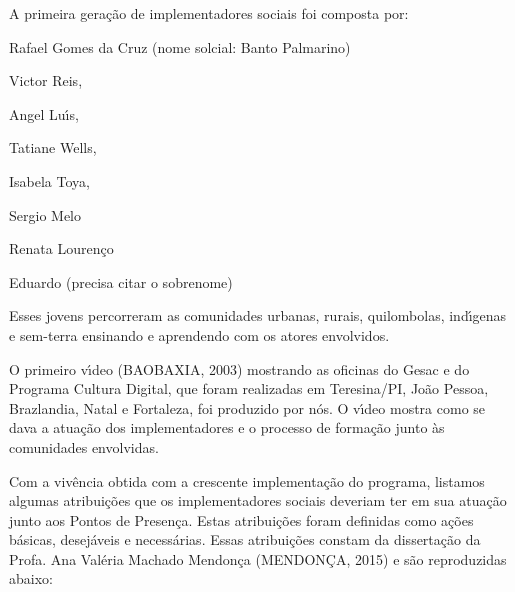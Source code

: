 \documentclass[
12pt,		%
openright,	%
twoside,  %
a4paper,			%
chapter=TITLE,		%
english,			%
french,				%
spanish,			%
brazil				%
]{USPSC-classe/USPSC}
\begin{document}
A  primeira gera\c{c}\~ao de implementadores  sociais foi composta por:















\begin{alineas}
\item Rafael Gomes da Cruz (nome solcial: Banto Palmarino)
\item Victor Reis,
\item Angel Lu\'{\i}s,
\item Tatiane Wells,
\item Isabela Toya,
\item Sergio Melo
\item Renata Louren\c{c}o
\item Eduardo (precisa citar o sobrenome)
\end{alineas}

Esses jovens percorreram as comunidades urbanas, rurais, quilombolas, ind\'{\i}genas e sem-terra ensinando e aprendendo com os atores envolvidos.














O primeiro v\'{\i}deo  (BAOBAXIA, 2003)  mostrando as oficinas do Gesac e do Programa Cultura Digital, que foram realizadas em Teresina/PI, Jo\~ao Pessoa, Brazlandia, Natal e Fortaleza, foi produzido por n\'os. O v\'{\i}deo mostra como se dava a atua\c{c}\~ao dos implementadores e o processo de forma\c{c}\~ao junto \`as comunidades envolvidas.














Com a viv\^encia obtida com a crescente implementa\c{c}\~ao do programa, listamos  algumas atribui\c{c}\~oes que os implementadores sociais deveriam ter em sua atua\c{c}\~ao junto aos Pontos de Presen\c{c}a. Estas atribui\c{c}\~oes foram definidas como a\c{c}\~oes b\'asicas, desej\'aveis e necess\'arias. Essas atribui\c{c}\~oes constam da disserta\c{c}\~ao da Profa. Ana Val\'eria Machado Mendon\c{c}a  (MENDON\c{C}A, 2015) e s\~ao reproduzidas abaixo:
\end{document}
